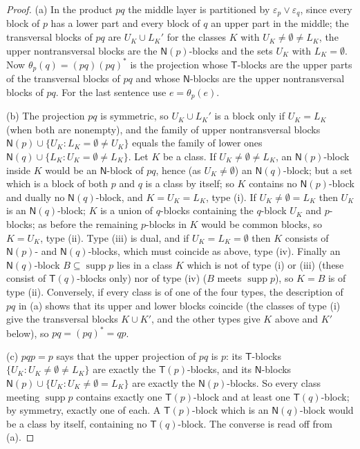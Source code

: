 \documentclass[11pt]{amsart}
\theoremstyle{definition}
\newcommand{\supp}{\operatorname{supp}}
\newcommand{\T}{\mathsf{T}}
\newcommand{\N}{\mathsf{N}}
\begin{document}
\begin{proof}
(a) In the product $pq$ the middle layer is partitioned by $\varepsilon_p\vee\varepsilon_q$, since every block of $p$ has a lower part and every block of $q$ an upper part in the middle; the transversal blocks of $pq$ are $U_K\cup L_K'$ for the classes $K$ with $U_K\ne\emptyset\ne L_K$, the upper nontransversal blocks are the $\N(p)$-blocks and the sets $U_K$ with $L_K=\emptyset$. Now $\theta_p(q)=(pq)(pq)^*$ is the projection whose $\T$-blocks are the upper parts of the transversal blocks of $pq$ and whose $\N$-blocks are the upper nontransversal blocks of $pq$. For the last sentence use $e=\theta_p(e)$.

(b) The projection $pq$ is symmetric, so $U_K\cup L_K'$ is a block only if $U_K=L_K$ (when both are nonempty), and the family of upper nontransversal blocks $\N(p)\cup\{U_K:L_K=\emptyset\ne U_K\}$ equals the family of lower ones $\N(q)\cup\{L_K:U_K=\emptyset\ne L_K\}$. Let $K$ be a class. If $U_K\ne\emptyset\ne L_K$, an $\N(p)$-block inside $K$ would be an $\N$-block of $pq$, hence (as $U_K\ne\emptyset$) an $\N(q)$-block; but a set which is a block of both $p$ and $q$ is a class by itself; so $K$ contains no $\N(p)$-block and dually no $\N(q)$-block, and $K=U_K=L_K$, type (i). If $U_K\ne\emptyset=L_K$ then $U_K$ is an $\N(q)$-block; $K$ is a union of $q$-blocks containing the $q$-block $U_K$ and $p$-blocks; as before the remaining $p$-blocks in $K$ would be common blocks, so $K=U_K$, type (ii). Type (iii) is dual, and if $U_K=L_K=\emptyset$ then $K$ consists of $\N(p)$- and $\N(q)$-blocks, which must coincide as above, type (iv). Finally an $\N(q)$-block $B\subseteq\supp p$ lies in a class $K$ which is not of type (i) or (iii) (these consist of $\T(q)$-blocks only) nor of type (iv) ($B$ meets $\supp p$), so $K=B$ is of type (ii). Conversely, if every class is of one of the four types, the description of $pq$ in (a) shows that its upper and lower blocks coincide (the classes of type (i) give the transversal blocks $K\cup K'$, and the other types give $K$ above and $K'$ below), so $pq=(pq)^*=qp$.

(c) $pqp=p$ says that the upper projection of $pq$ is $p$: its $\T$-blocks $\{U_K:U_K\ne\emptyset\ne L_K\}$ are exactly the $\T(p)$-blocks, and its $\N$-blocks $\N(p)\cup\{U_K:U_K\ne\emptyset=L_K\}$ are exactly the $\N(p)$-blocks. So every class meeting $\supp p$ contains exactly one $\T(p)$-block and at least one $\T(q)$-block; by symmetry, exactly one of each. A $\T(p)$-block which is an $\N(q)$-block would be a class by itself, containing no $\T(q)$-block. The converse is read off from (a).
\end{proof}
\end{document}
